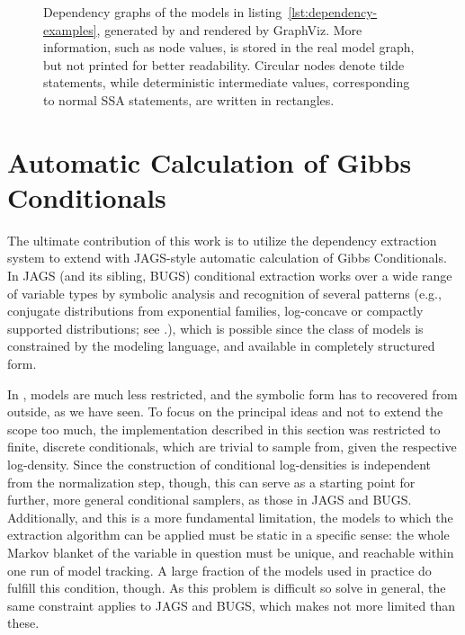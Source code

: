 \begin{figure}[p]
  \caption{Dependency graphs of the models in listing~\ref{lst:dependency-examples}, generated by
    \autogibbsjl{} and rendered by GraphViz.  More information, such as node values, is stored in
    the real model graph, but not printed for better readability.  Circular nodes denote tilde
    statements, while deterministic intermediate values, corresponding to normal SSA statements, are
    written in rectangles.}
  \label{fig:geom-deps}
\end{figure}


\section{Automatic Calculation of Gibbs Conditionals}
\label{sec:automatic-conditionals}

The ultimate contribution of this work is to utilize the dependency extraction system to extend
\turingjl{} with JAGS-style automatic calculation of Gibbs Conditionals.  In JAGS (and its sibling,
BUGS) conditional extraction works over a wide range of variable types \parencite{plummer2003jags}
by symbolic analysis and recognition of several patterns (e.g., conjugate distributions from
exponential families, log-concave or compactly supported distributions; see
\textcite{lunn2000winbugs}.), which is possible since the class of models is constrained by the
modeling language, and available in completely structured form.

In \turingjl{}, models are much less restricted, and the symbolic form has to recovered from
outside, as we have seen.  To focus on the principal ideas and not to extend the scope too much, the
implementation described in this section was restricted to finite, discrete conditionals, which are
trivial to sample from, given the respective log-density.  Since the construction of conditional
log-densities is independent from the normalization step, though, this can serve as a starting point
for further, more general conditional samplers, as those in JAGS and BUGS.  Additionally, and this
is a more fundamental limitation, the models to which the extraction algorithm can be applied must
be static in a specific sense: the whole Markov blanket of the variable in question must be unique,
and reachable within one run of model tracking.  A large fraction of the models used in practice
do fulfill this condition, though.  As this problem is difficult so solve in general, the same
constraint applies to JAGS and BUGS, which makes \autogibbsjl{} not more limited than these.

